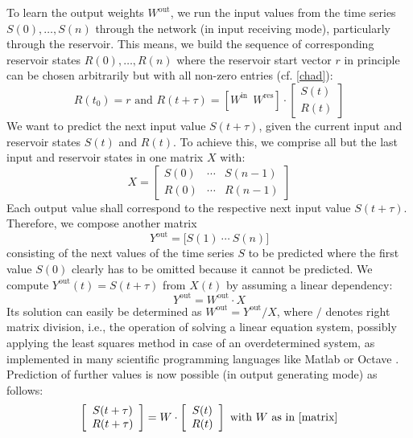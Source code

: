 \documentclass[twoside,11pt]{article}
\theoremstyle{definition}
\begin{document}
To learn the output weights $W^\mathrm{out}$, we run the input values from the
time series $S(0),\dots,S(n)$ through the network (in input receiving mode),
particularly through the reservoir. This means, we build the sequence of
corresponding reservoir states $R(0),\dots,R(n)$ where the reservoir start
vector $r$ in principle can be chosen arbitrarily but with all non-zero
entries (cf. \cref{chad}):
\begin{equation}\label{Res}
	R(t_0) = r \text{~and~} R(t+\tau) =
	\left[ W^\mathrm{in} ~~ W^\mathrm{res} \right] \cdot
	\left[ \begin{array}{c} S(t) \\ R(t) \end{array} \right]
\end{equation}
We want to predict the next input value $S(t+\tau)$, given the current input and
reservoir states $S(t)$ and $R(t)$. To achieve this, we comprise
all but the last input and reservoir states in one matrix $X$ with:
\begin{equation}\label{Xin}
    X = \left[ \begin{array}{ccc}
	S(0) & \cdots & S(n-1)\\
	R(0) & \cdots & R(n-1)
	\end{array} \right]
\end{equation}
Each output value shall correspond to the respective next input value $S(t+\tau)$.
Therefore, we compose another matrix
\begin{equation}\label{Yout}
	Y^\mathrm{out} = \big[ S(1)\ \cdots\ S(n) \big]
\end{equation}
consisting of the next values of the time series $S$ to be predicted
where the first value $S(0)$ clearly has to be omitted because it cannot be
predicted. We compute $Y^\mathrm{out}(t) = S(t+\tau)$ from $X(t)$ by assuming a
linear dependency:
\begin{equation}\label{linear}
	Y^\mathrm{out} = W^\mathrm{out} \cdot X
\end{equation}
Its solution can easily be determined as $W^\mathrm{out} = Y^\mathrm{out}/X$,
where $/$ denotes right matrix division, i.e., the operation of solving a linear
equation system, possibly applying the least squares method in case of an
overdetermined system, as implemented in many scientific programming languages
like Matlab \citep{HH17} or Octave \citep{EB+17}. Prediction of further values
is now possible (in output generating mode) as follows:
\begin{equation}\label{predict}
	\left[ \begin{array}{c} S(t+\tau) \\ R(t+\tau) \end{array} \right]
	= W \cdot \left[ \begin{array}{c} S(t) \\ R(t) \end{array} \right]
	\text{~with~} W \text{~as in \cref{matrix}}
\end{equation}
\end{document}
